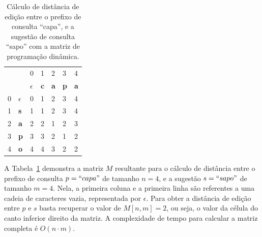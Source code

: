 \begin{table}[h]
\centering
\begin{tabular}{lllllll}
 &  & {\color[HTML]{C0C0C0} 0} & {\color[HTML]{C0C0C0} 1} & {\color[HTML]{C0C0C0} 2} & {\color[HTML]{C0C0C0} 3} & {\color[HTML]{C0C0C0} 4} \\
 &  & $\epsilon$ & \textbf{c} & \textbf{a} & \textbf{p} & \textbf{a} \\ \cline{3-7} 
{\color[HTML]{C0C0C0} 0} & \multicolumn{1}{l|}{$\epsilon$} & \multicolumn{1}{l|}{0} & \multicolumn{1}{l|}{1} & \multicolumn{1}{l|}{2} & \multicolumn{1}{l|}{3} & \multicolumn{1}{l|}{4} \\ \cline{3-7} 
{\color[HTML]{C0C0C0} 1} & \multicolumn{1}{l|}{\textbf{s}} & \multicolumn{1}{l|}{1} & \multicolumn{1}{l|}{1} & \multicolumn{1}{l|}{2} & \multicolumn{1}{l|}{3} & \multicolumn{1}{l|}{4} \\ \cline{3-7} 
{\color[HTML]{C0C0C0} 2} & \multicolumn{1}{l|}{\textbf{a}} & \multicolumn{1}{l|}{2} & \multicolumn{1}{l|}{2} & \multicolumn{1}{l|}{1} & \multicolumn{1}{l|}{2} & \multicolumn{1}{l|}{3} \\ \cline{3-7} 
{\color[HTML]{C0C0C0} 3} & \multicolumn{1}{l|}{\textbf{p}} & \multicolumn{1}{l|}{3} & \multicolumn{1}{l|}{3} & \multicolumn{1}{l|}{2} & \multicolumn{1}{l|}{1} & \multicolumn{1}{l|}{2} \\ \cline{3-7} 
{\color[HTML]{C0C0C0} 4} & \multicolumn{1}{l|}{\textbf{o}} & \multicolumn{1}{l|}{4} & \multicolumn{1}{l|}{4} & \multicolumn{1}{l|}{3} & \multicolumn{1}{l|}{2} & \multicolumn{1}{l|}{2} \\ \cline{3-7} 
\end{tabular}
\caption{Cálculo de distância de edição entre o prefixo de consulta ``capa'', e a sugestão de consulta ``sapo'' com a matriz de programação dinâmica.}
\label{tab:levenhstein_matrix_sequential_search}
\end{table}

A Tabela~\ref{tab:levenhstein_matrix_sequential_search} demonstra a matriz $M$ resultante para o cálculo de distância entre o prefixo de consulta $p = ``capa"$ de tamanho $n=4$, e a sugestão $s = ``sapo"$ de tamanho $m=4$. Nela, a primeira coluna e a primeira linha são referentes a uma cadeia de caracteres vazia, representada por $\epsilon$. Para obter a distância de edição entre $p$ e $s$ basta recuperar o valor de $M[n, m] = 2$, ou seja, o valor da célula do canto inferior direito da matriz. A complexidade de tempo para calcular a matriz completa é $O(n \cdot m)$. 

